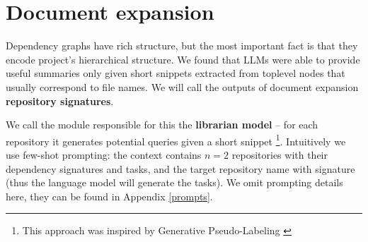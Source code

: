 \section{Document expansion}
\label{approach_document_expansion}
Dependency graphs have rich structure, but the most important fact is that they encode project's hierarchical structure. We found that LLMs were able to provide useful summaries only given short snippets extracted from toplevel nodes that usually correspond to file names. We will call the outputs of document expansion \textbf{repository signatures}.

We call the module responsible for this the \textbf{librarian model} -- for each repository it generates potential queries given a short snippet \footnote{This approach was inspired by Generative Pseudo-Labeling \cite{gpl}}. Intuitively we use few-shot prompting: the context contains $n=2$ repositories with their dependency signatures and tasks, and the target repository name with signature (thus the language model will generate the tasks). We omit prompting details here, they can be found in Appendix \ref{prompts}.

